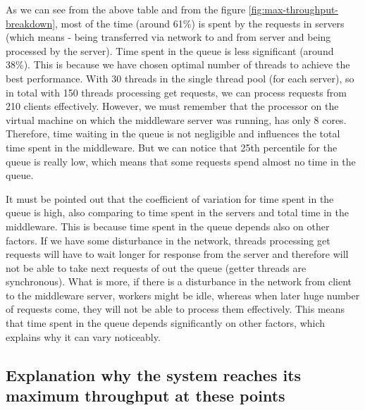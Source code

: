\documentclass[11pt]{article}
\begin{document}
As we can see from the above table and from the figure \ref{fig:max-throughput-breakdown}, most of the time (around 61\%) is spent by the requests in servers (which means - being transferred via network to and from server and being processed by the server). Time spent in the queue is less significant (around 38\%). This is because we have chosen optimal number of threads to achieve the best performance. With 30 threads in the single thread pool (for each server), so in total with 150 threads processing get requests, we can process requests from 210 clients effectively. However, we must remember that the processor on the virtual machine on which the middleware server was running, has only 8 cores. Therefore, time waiting in the queue is not negligible and influences the total time spent in the middleware. But we can notice that 25th percentile for the queue is really low, which means that some requests spend almost no time in the queue.

It must be pointed out that the coefficient of variation for time spent in the queue is high, also comparing to time spent in the servers and total time in the middleware. This is because time spent in the queue depends also on other factors. If we have some disturbance in the network, threads processing get requests will have to wait longer for response from the server and therefore will not be able to take next requests of out the queue (getter threads are synchronous). What is more, if there is a disturbance in the network from client to the middleware server, workers might be idle, whereas when later huge number of requests come, they will not be able to process them effectively. This means that time spent in the queue depends significantly on other factors, which explains why it can vary noticeably.

\subsection{Explanation why the system reaches its maximum throughput at these points}
\label{sec:max-throughput-explanation}
\end{document}
